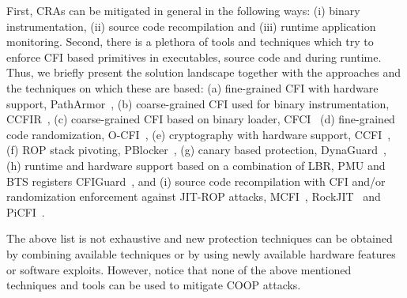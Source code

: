 First, CRAs can be mitigated in general in the following ways: 
(i) binary instrumentation,
(ii) source code recompilation and 
(iii) runtime application monitoring.
Second, there is a plethora of tools and techniques which try to enforce CFI based
primitives in executables, source code and during runtime. Thus, we briefly
present the solution landscape together with the approaches and the techniques on which these are based:
(a) fine-grained CFI with hardware support, PathArmor~\cite{veen:cfi},
(b) coarse-grained CFI used for binary instrumentation, CCFIR~\cite{ccfir:zhang},
(c) coarse-grained CFI based on binary loader, CFCI~\cite{cfci:zhang}
(d) fine-grained code randomization, O-CFI~\cite{mohan:opaque},
(e) cryptography with hardware support, CCFI~\cite{ccfi:jose},
(f) ROP stack pivoting, PBlocker~\cite{pblocker:prakash},
(g) canary based protection, DynaGuard~\cite{dynaguard:petsios},
(h) runtime and hardware support based on a combination of LBR, PMU and BTS registers CFIGuard~\cite{cfiguard:yuan}, and
(i) source code recompilation with CFI and/or randomization enforcement against JIT-ROP attacks, MCFI~\cite{mcfi:niu}, 
RockJIT~\cite{rockjit:niu} and PiCFI~\cite{perinput:niu}.

The above list is not exhaustive and new protection techniques can be obtained by combining available techniques
or by using newly available hardware features or software exploits. However, notice that none of the above mentioned 
techniques and tools can be used to mitigate COOP attacks.


